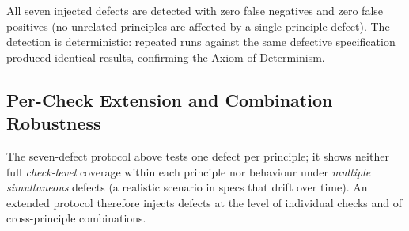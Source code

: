 \begin{table}[htbp]
\centering
\caption{Defect injection matrix: each injected defect targets one principle.}
\label{tab:defect-injection}
\small
{}
\end{table}

All seven injected defects are detected with zero false negatives and zero false positives (no unrelated principles are affected by a single-principle defect). The detection is deterministic: repeated runs against the same defective specification produced identical results, confirming the Axiom of Determinism.

\subsection{Per-Check Extension and Combination Robustness}
\label{subsec:per-check-extension}

The seven-defect protocol above tests one defect per principle; it shows neither full \emph{check-level} coverage within each principle nor behaviour under \emph{multiple simultaneous} defects (a realistic scenario in specs that drift over time). An extended protocol therefore injects defects at the level of individual checks and of cross-principle combinations.

